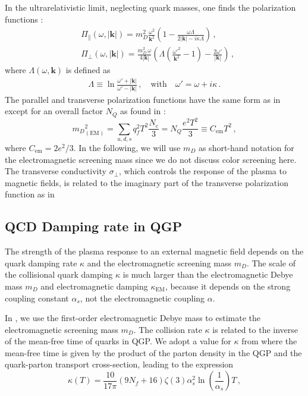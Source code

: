 In the ultrarelativistic limit, neglecting quark masses, one finds the polarization functions \cite{Formanek:2021blc}:
\begin{align}\label{eq:polfuncsUltra}
&\Pi_{\parallel}(\omega,|\boldsymbol{k}|) = m_D^2\frac{\omega^2}{\boldsymbol{k}^2}\left(1 - \frac{\omega \Lambda}{2|\boldsymbol{k}|-i\kappa \Lambda}\right)\,,\\
&\Pi_{\perp}(\omega,|\boldsymbol{k}|) = \frac{m_D^2\,\omega}{4 |\boldsymbol{k}|}\left( \Lambda \left(\frac{\omega'^2}{\boldsymbol{k}^2} - 1\right) - \frac{2\omega'}{ |\boldsymbol{k}|}\right)\,,
\end{align}
where $\Lambda(\omega,\boldsymbol{k})$ is defined as
\begin{align}\label{eq:definitions}
 \Lambda \equiv \ln \frac{\omega'+  |\boldsymbol{k}|}{\omega'- |\boldsymbol{k}|}\,, \quad \text{with} \quad \omega' = \omega+i\kappa\,.
\end{align}
The parallel and transverse polarization functions have the same form as in \cite{Formanek:2021blc} except for an overall factor $N_Q$  as found in \cite{Kapusta:1992fm, Grayson:2022asf}:
\begin{equation}\label{eq:DebyemQCD}
    {m_D}^2_{(\text{EM})} = \sum_{u,d,s} q^2_f T^2 \frac{N_c}{3} = N_Q\frac{e^2T^2}{3} \equiv C_{\text{em}}T^2\,,
\end{equation}
where $C_{\text{em}} =  2e^2/3$. In the following, we will use $m_D$ as short-hand notation for the electromagnetic screening mass since we do not discuss color screening here.
The transverse conductivity $\sigma_{\perp}$, which controls the response of the plasma to magnetic fields, is related to the imaginary part of the transverse polarization function as in 



\subsection{QCD Damping rate in QGP}

The strength of the plasma response to an external magnetic field depends on the quark damping rate $\kappa$ and the electromagnetic screening mass $m_D$. The scale of the collisional quark damping $\kappa$ is much larger than the electromagnetic Debye mass $m_D$ and electromagnetic damping $\kappa_{\text{EM}}$, because it depends on the strong coupling constant $\alpha_s$, not the electromagnetic coupling $\alpha$.

In \cite{Grayson:2022asf}, we use the first-order electromagnetic Debye mass  to estimate the electromagnetic screening mass $m_D$. The collision rate $\kappa$ is related to the inverse of the mean-free time of quarks in QGP. We adopt a value for $\kappa$ from \cite{Mrowczynski:1988xu} where the mean-free time is given by the product of the parton density in the QGP and the quark-parton transport cross-section, leading to the expression 
\begin{equation}\label{eq:kappadef}
    \kappa(T) = \frac{10}{17\pi} (9 N_f +16) \zeta(3) \alpha_s^2 \ln\left(\frac{1}{\alpha_s}\right) T\,,
\end{equation}

